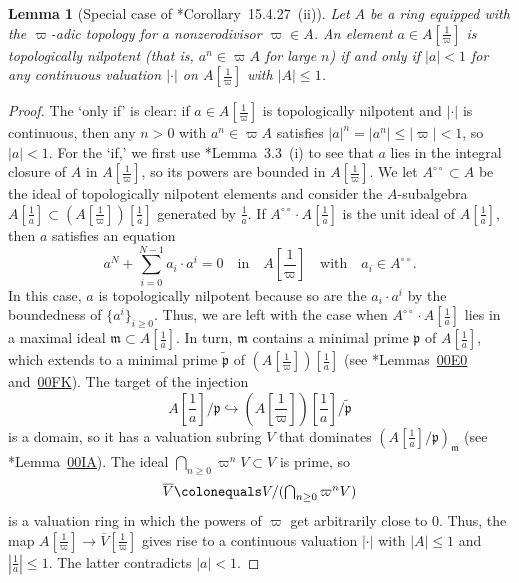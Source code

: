 \documentclass[11pt, reqno]{amsart}
\newcommand{\fm}{\mathfrak{m}}
\newcommand{\fp}{\mathfrak{p}}
\newcommand{\ce}{\colonequals}
\newcommand{\hra}{\hookrightarrow}
\newcommand{\ov}{\overline}
\newcommand{\ra}{\rightarrow}
\newcommand{\wt}{\widetilde}
\providecommand{\abs}[1]{\left\lvert#1\right\rvert}
\providecommand{\up}[1]{{\upshape(}#1{\upshape)}}
\providecommand{\f}[2]{\frac{#1}{#2}}
\newcommand{\blem}{\begin{lemma}}
\newcommand{\elem}{\end{lemma}}
\newcommand{\x}{\text}
\newcommand{\q}{\quad}
\newcommand{\tst}{\textstyle}
\newcommand{\bpf}{\begin{proof}}
\newcommand{\epf}{\end{proof}}
\numberwithin{equation}{numberingbase}
\theoremstyle{thms}
\newtheorem{lemma}[numberingbase]{Lemma}
\theoremstyle{claims}
\theoremstyle{defs}
\theoremstyle{thms}
\theoremstyle{defs}
\theoremstyle{subsection-tweak}
\theoremstyle{subsection-tweak}
\begin{document}
\blem[Special case of \cite{GR18}*{Corollary~15.4.27~(ii)}] \label{nilp-lem}
Let $A$ be a ring equipped with the $\varpi$-adic topology for a nonzerodivisor $\varpi \in A$. An element $a \in A[\f{1}{\varpi}]$ is topologically nilpotent \up{that is, $a^n \in \varpi A$ for large $n$} if and only if $\abs{a} < 1$ for any continuous valuation $\abs{\cdot}$ on $A[\f{1}{\varpi}]$ with $\abs{A} \le 1$.
\elem

\bpf
The `only if' is clear: if $a \in A[\f{1}{\varpi}]$ is topologically nilpotent and $\abs{\cdot}$ is continuous, then any $n > 0$ with $a^n \in \varpi A$ satisfies $|a|^n = |a^n| \le |\varpi| < 1$, so $|a| < 1$. For the `if,' we first use \cite{Hub93a}*{Lemma~3.3~(i)} to see that $a$ lies in the integral closure of $A$ in $A[\f{1}{\varpi}]$, so its powers are bounded in $A[\f{1}{\varpi}]$. We let $A^{\circ\circ} \subset A$ be the ideal of topologically nilpotent elements %
and consider the $A$-subalgebra 
$A[\f{1}{a}] \subset (A[\f{1}{\varpi}])[\f{1}{a}]$ generated by $\f{1}{a}$. 
If $A^{\circ\circ}\cdot A[\f{1}{a}]$ is the unit ideal of $A[\f{1}{a}]$, then $a$ satisfies an equation %
\[
\tst a^N + \sum_{i = 0}^{N - 1} a_i \cdot a^i = 0 \q \x{in} \q A[\f{1}{\varpi}] \q \x{with} \q a_i \in A^{\circ\circ}.
\]
In this case, $a$ is topologically nilpotent because so are the $a_i \cdot a^i$ by the boundedness of $\{a^i\}_{i \ge 0}$. Thus, we are left with the case when $A^{\circ\circ} \cdot A[\f{1}{a}]$ lies in a maximal ideal $\fm \subset A[\f{1}{a}]$. In turn, $\fm$ contains a minimal prime $\fp$ of $A[\f{1}{a}]$, which extends to a minimal prime $\wt{\fp}$ of $(A[\f{1}{\varpi}])[\f{1}{a}]$ (see \cite{SP}*{Lemmas~\href{https://stacks.math.columbia.edu/tag/00E0}{00E0} and~\href{https://stacks.math.columbia.edu/tag/00FK}{00FK}}). The target of the injection 
\[
\tst A[\f{1}{a}]/\fp \hra (A[\f{1}{\varpi}])[\f{1}{a}]/\wt{\fp}
\] 
is a domain, so it has a valuation subring $V$ that dominates $(A[\f{1}{a}]/\fp)_\fm$ (see \cite{SP}*{Lemma~\href{https://stacks.math.columbia.edu/tag/00IA}{00IA}}). The ideal $\bigcap_{n \ge 0} \varpi^n V \subset V$ is prime, so 
\[
\tst\overline{V} \ce V/(\bigcap_{n \ge 0} \varpi^n V)
\]
is a valuation ring in which the powers of $\varpi$ get arbitrarily close to $0$. Thus, the map $A[\f{1}{\varpi}] \ra \ov{V}[\f{1}{\varpi}]$ gives rise to a continuous valuation $\abs{\cdot}$ with $\abs{A} \le 1$ and $|\f{1}{a} | \le 1$. The latter contradicts $\abs{a} < 1$.
\epf
\end{document}
